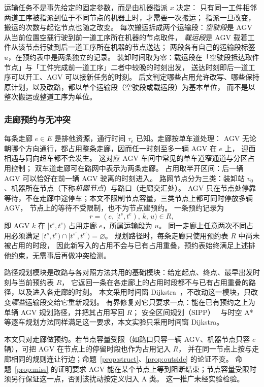 \documentclass[manuscript,screen,review]{acmart}
\begin{document}
运输任务不是事先给定的固定参数，而是由机器指派 \(x\) 决定：
只有同一工件相邻两道工序被指派到位于不同节点的机器上时，才需要一次搬运；
指派一旦改变，搬运的次数与起讫节点也随之改变。
每次搬运拆成两个运输段：\emph{空驶段}是 AGV 从当前位置空载行驶到前一道工序所在机器的节点取件，
\emph{载运段}是 AGV 载着工件从该节点行驶到后一道工序所在机器的节点送达；
两段各有自己的运输段标签 \(u\)，在预约表中是两条独立的记录。
装卸时间取为零：载运段在「空驶段抵达取件节点」与「工件完成前一道工序」二者中较晚的时刻出发，
送达时刻即后一道工序可以开工、AGV 可以接新任务的时刻。
后文判定哪些占用允许改写、哪些保持原计划，以及改路，都以单个运输段（空驶段或载运段）为基本单位，
而不是以整次搬运或整道工序为单位。

\subsubsection{走廊预约与无冲突}
\label{sec:reservation}

每条走廊 \(e\in E\) 是排他资源，通行时间 \(\tau_e\) 已知。走廊按单车道处理：
AGV 无论朝哪个方向通行，都占用整条走廊，因而任一时刻至多一辆 AGV 在 \(e\) 上，
迎面相遇与同向超车都不会发生。
这对应 AGV 车间中常见的单车道窄通道与分区占用控制；
双车道走廊可在路网中表示为两条走廊。
占用取半开区间：后一辆 AGV 可以恰好在前一辆 AGV 驶离的时刻进入。
路网节点分为三类：装卸站 \(v_0\)、机器所在节点（下称\emph{机器节点}）与路口（走廊交汇处）。
AGV 只在节点处停靠等待，不在走廊中途停车；本文不限制节点容量，三类节点上都可同时停放多辆 AGV，
节点上的等待不受限制，也不为节点建预约。
一条预约记录为
\[
r=(e,\,[t^s,t^e),\,k,\,u)\in R,
\]
即 AGV \(k\) 在 \([t^s,t^e)\) 占用走廊 \(e\)，所属运输段为 \(u\)。
同一走廊上任意两次不同占用必须满足
\([t^s,t^e)\cap[t^{s\prime},t^{e\prime})=\varnothing\)。
规划路径时，每条走廊只使用预约表 \(R\) 中尚未被占用的时段，
因此新写入的占用不会与已有占用重叠，预约表始终满足上述排他约束，无需事后再做冲突检测。

路径规划模块是改路与各对照方法共用的基础模块：给定起点、终点、最早出发时刻与当前预约表 \(R\)，
它返回一条在各走廊上的占用时段都不与已有占用重叠的路径，以及进入各走廊的时刻。
本文采用时间窗 Dijkstra~\cite{shan2021pull,sun2023integrated}，不改动这一模块，只改变\emph{哪些}运输段交给它重新规划。
有界修复对它只要求一点：能在已有预约之上为单辆 AGV 规划路径，并把其占用写回 \(R\)；
安全区间规划（SIPP）~\cite{phillips2011sipp,kasaura2022sipp} 与时空 A*~\cite{silver2005cooperative}
等逐车规划方法同样满足这一要求，本文实验只采用时间窗 Dijkstra。

本文只对走廊做预约。若节点容量受限（如路口只容一辆 AGV、机器节点只容 \(c\) 辆），可把 AGV 在节点上的停留时段也作为占用记入 \(R\)，
并在同一节点上按与走廊相同的规则连让行边；命题~\ref{prop:struct}、\ref{prop:outside} 的论证不变。
命题~\ref{prop:miss} 的证明要求 AGV 能在某个节点上等到阻断结束；节点容量受限时须另行保证这一点，否则该扰动按定义归入 A 类。
这一推广未经实验检验。
\end{document}
